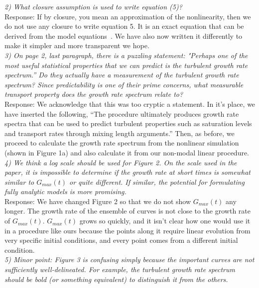 \documentclass[12pt]{article}
\begin{document}
\emph{2) What closure assumption is used to write equation (5)?} \\

Response: If by closure, you mean an approximation of the
nonlinearity, then we do not use any closure to write equation 5.  It is an exact equation that can be derived from the model equations~\cite{friedman2012b,friedman2013}.
We have also now written it differently to make it simpler and more transparent we hope. \\

\emph{3) On page 2, last paragraph, there is a puzzling statement: "Perhaps one of the most
useful statistical properties that we can predict is the turbulent growth rate spectrum.” Do
they actually have a measurement of the turbulent growth rate spectrum? Since
predictability is one of their prime concerns, what measurable transport property does the
growth rate spectrum relate to?} \\

Response: We acknowledge that this was too cryptic a statement. In it's place, we have inserted the following, 
``The procedure ultimately produces growth rate spectra that can be used to predict turbulent properties such as saturation levels and transport rates through mixing length arguments.''
Then, as before, we proceed to calculate the growth rate spectrum from the nonlinear simulation (shown in Figure 1a) and also calculate it from our non-modal linear procedure. \\


\emph{4) We think a log scale should be used for Figure 2. On the scale used in the paper, it is
impossible to determine if the growth rate at short times is somewhat similar to $G_{max} (t)$
or quite different. If similar, the potential for formulating fully analytic models is more
promising.} \\

Response: We have changed Figure 2 so that we do not show $G_{max}(t)$ any longer. The growth rate of the ensemble of curves is not close to the growth rate of $G_{max}(t)$. $G_{max}(t)$  grows so quickly,
and it isn't clear how one would use it in a procedure like ours because the points along it require linear evolution from very specific initial conditions, and every point comes from a different initial condition. \\

\emph{5) Minor point: Figure 3 is confusing simply because the important curves are not
sufficiently well-delineated. For example, the turbulent growth rate spectrum should be
bold (or something equivalent) to distinguish it from the others.} \\
\end{document}
